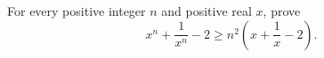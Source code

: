 For every positive integer $n$ and positive real $x$, prove
\[
x^n+\dfrac{1}{x^n}-2\ge n^2\left(x+\dfrac{1}{x}-2\right).
\]
